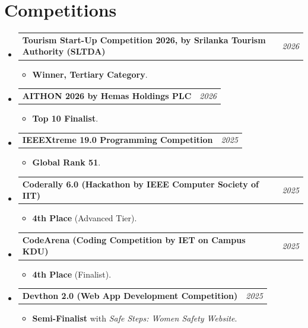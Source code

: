 \documentclass[a4paper,10pt]{article}
\makeatletter
\newcommand{\resumeItem}[1]{\item\small{#1}}
\newcommand{\resumeProjectHeading}[2]{
  \vspace{-1pt}\item
    \begin{tabular*}{0.97\textwidth}{l@{\extracolsep{\fill}}r}
      \textbf{#1} & \textit{\small #2} \\
    \end{tabular*}\vspace{-5pt}
}
\makeatother
\begin{document}
\section{Competitions}
\begin{itemize}[leftmargin=0.15in, label={}, itemsep=0pt, topsep=2pt]
    \resumeProjectHeading
      {Tourism Start-Up Competition 2026, by Srilanka Tourism Authority (SLTDA)}{2026}
      \begin{itemize}[leftmargin=0.15in, label={\tiny$\bullet$}]
        \resumeItem{\textbf{Winner, Tertiary Category}.}
      \end{itemize}

    \resumeProjectHeading
      {AITHON 2026 by Hemas Holdings PLC}{2026}
      \begin{itemize}[leftmargin=0.15in, label={\tiny$\bullet$}]
        \resumeItem{\textbf{Top 10 Finalist}.}
      \end{itemize}

    \resumeProjectHeading
      {IEEEXtreme 19.0 Programming Competition}{2025}
      \begin{itemize}[leftmargin=0.15in, label={\tiny$\bullet$}]
        \resumeItem{\textbf{Global Rank 51}.}
      \end{itemize}

    \resumeProjectHeading
      {Coderally 6.0 (Hackathon by IEEE Computer Society of IIT)}{2025}
      \begin{itemize}[leftmargin=0.15in, label={\tiny$\bullet$}]
        \resumeItem{\textbf{4th Place} (Advanced Tier).}
      \end{itemize}

    \resumeProjectHeading
      {CodeArena (Coding Competition by IET on Campus KDU)}{2025}
      \begin{itemize}[leftmargin=0.15in, label={\tiny$\bullet$}]
        \resumeItem{\textbf{4th Place} (Finalist).}
      \end{itemize}

    \resumeProjectHeading
      {Devthon 2.0 (Web App Development Competition)}{2025}
      \begin{itemize}[leftmargin=0.15in, label={\tiny$\bullet$}]
        \resumeItem{\textbf{Semi-Finalist} with \textit{Safe Steps: Women Safety Website}.}
      \end{itemize}
\end{itemize}
\end{document}
